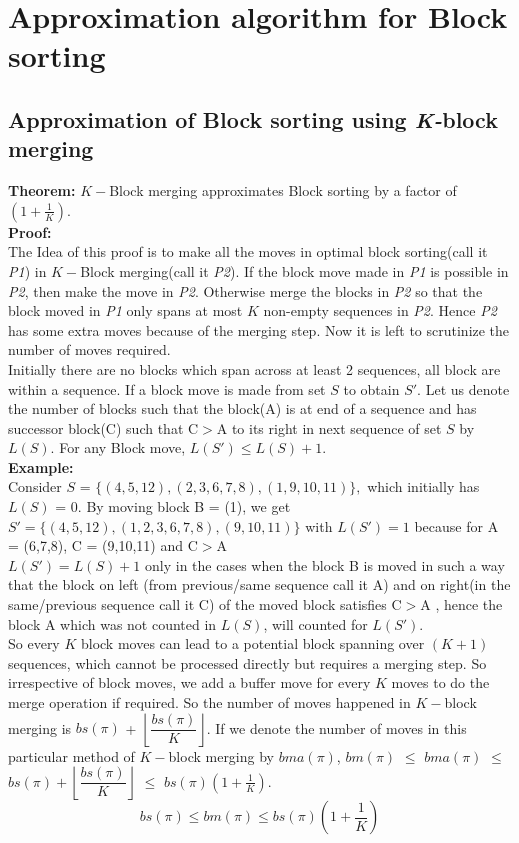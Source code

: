 \documentclass[BTech]{iitmdiss}
\begin{document}
\chapter{Approximation algorithm for Block sorting}
\section{Approximation of Block sorting using \textit{K-}block merging}
\textbf{Theorem:} $K-$Block merging approximates Block sorting by a factor of $(1+\frac{1}{K})$.\\
\textbf{Proof:}\\
The Idea of this proof is to make all the moves in optimal block sorting(call it \textit{P1}) in $K-$Block merging(call it \textit{P2}). If the block move made in \textit{P1} is possible in \textit{P2}, then make the move in \textit{P2}. Otherwise merge the blocks in \textit{P2} so that the block moved in \textit{P1} only spans at most $K$ non-empty sequences in \textit{P2}. Hence \textit{P2} has some extra moves because of the merging step. Now it is left to scrutinize the number of moves required.\\
Initially there are no blocks which span across at least 2 sequences, all block are within a sequence. If a block move is made from set $S$ to obtain $S'$. Let us denote the number of blocks such that the block(A) is at end of a sequence and has successor block(C) such that C$>$A to its right in next sequence of set $S$ by $L(S)$. For any Block move, $L(S') \leq L(S) + 1.$\\
\textbf{Example:}\\
Consider $S$ = $\{(4,5,12),(2,3,6,7,8),(1,9,10,11)\},$ which initially has $L(S)$ = 0. By moving block B = (1), we get $S' = \{(4,5,12),(1,2,3,6,7,8),(9,10,11)\}$ with $L(S') = 1$ because for A = (6,7,8), C = (9,10,11) and C$>$A \\
$L(S') = L(S) + 1$ only in the cases when the block B is moved in such a way that the block on left (from previous/same sequence call it A) and on right(in the same/previous sequence call it C) of the moved block satisfies C$>$A , hence the block A which was not counted in $L(S)$, will counted for $L(S')$.\\
So every $K$ block moves can lead to a potential block spanning over $(K+1)$ sequences, which cannot be processed directly but requires a merging step. So irrespective of block moves, we add a buffer move for every $K$ moves to do the merge operation if required. So the number of moves happened in $K-$block merging is $bs(\pi)$ + $\left\lfloor\dfrac{bs(\pi)}{K}\right\rfloor$. If we denote the number of moves in this particular method of $K-$block merging by $bma(\pi)$, $bm(\pi)$ $\leq$  $bma(\pi)$ $\leq$  $bs(\pi) + \left\lfloor\dfrac{bs(\pi)}{K}\right\rfloor$ $\leq$ $bs(\pi)(1+\frac{1}{K})$.
$$bs(\pi) \leq bm(\pi) \leq bs(\pi)(1+\frac{1}{K})$$
\end{document}
